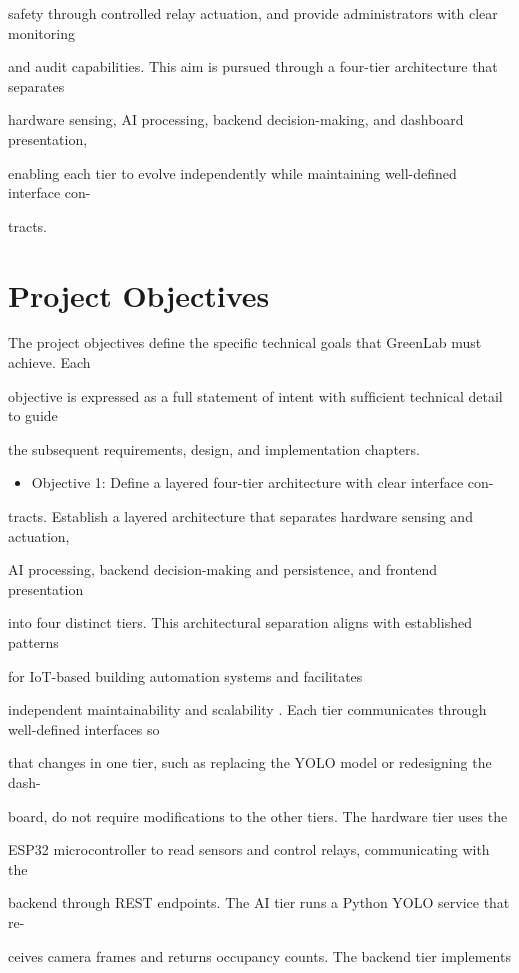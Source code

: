 safety through controlled relay actuation, and provide administrators with clear monitoring

and audit capabilities. This aim is pursued through a four-tier architecture that separates

hardware sensing, AI processing, backend decision-making, and dashboard presentation,

enabling each tier to evolve independently while maintaining well-deﬁned interface con-

tracts.


\section{Project Objectives}
The project objectives deﬁne the speciﬁc technical goals that GreenLab must achieve. Each

objective is expressed as a full statement of intent with sufﬁcient technical detail to guide

the subsequent requirements, design, and implementation chapters.

\begin{itemize}  \item Objective 1: Deﬁne a layered four-tier architecture with clear interface con-
\end{itemize}tracts. Establish a layered architecture that separates hardware sensing and actuation,

AI processing, backend decision-making and persistence, and frontend presentation

into four distinct tiers. This architectural separation aligns with established patterns

for IoT-based building automation systems \cite{kodali2017,rao2021} and facilitates

independent maintainability and scalability \cite{davies2024,fischer2025}. Each tier communicates through well-deﬁned interfaces so

that changes in one tier, such as replacing the YOLO model or redesigning the dash-

board, do not require modiﬁcations to the other tiers. The hardware tier uses the

ESP32 microcontroller to read sensors and control relays, communicating with the

backend through REST endpoints. The AI tier runs a Python YOLO service that re-

ceives camera frames and returns occupancy counts. The backend tier implements

